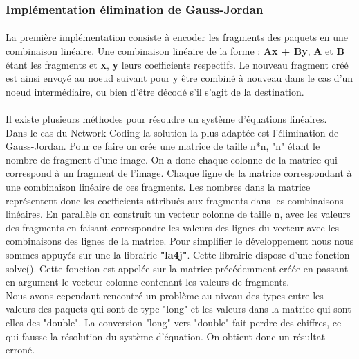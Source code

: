         
        \subsubsection{Implémentation élimination de Gauss-Jordan}
        
        \paragraph{}La première implémentation consiste à encoder les fragments des paquets en une combinaison linéaire.
        Une combinaison linéaire de la forme : \textbf{Ax + By}, \textbf{A} et \textbf{B} étant les fragments et \textbf{x}, \textbf{y} leurs coefficients respectifs.
        Le nouveau fragment créé est ainsi envoyé au noeud suivant pour y être combiné à nouveau dans le cas d'un noeud intermédiaire, ou bien d'être décodé s'il s'agit de la destination.
        
        \paragraph{}Il existe plusieurs méthodes pour résoudre un système d'équations linéaires.\\
        Dans le cas du Network Coding la solution la plus adaptée est l'élimination de Gauss-Jordan. 
        Pour ce faire on crée une matrice de taille n*n, "n" étant le nombre de fragment d'une image. 
        On a donc chaque colonne de la matrice qui correspond à un fragment de l'image.
        Chaque ligne de la matrice correspondant à une combinaison linéaire de ces fragments.
        Les nombres dans la matrice représentent donc les coefficients attribués aux fragments dans les combinaisons linéaires.
        En parallèle on construit un vecteur colonne de taille n, avec les valeurs des fragments en faisant correspondre les valeurs des lignes du vecteur avec les combinaisons des lignes de la matrice.
        Pour simplifier le développement nous nous sommes appuyés sur une la librairie \textbf{"la4j"}\cite{la4j}.
        Cette librairie dispose d'une fonction solve().
        Cette fonction est appelée sur la matrice précédemment créée en passant en argument le vecteur colonne contenant les valeurs de fragments.\\
        Nous avons cependant rencontré un problème au niveau des types entre les valeurs des paquets qui sont de type "long" et les valeurs dans la matrice qui sont elles des "double".
        La conversion "long" vers "double" fait perdre des chiffres, ce qui fausse la résolution du système d'équation. 
        On obtient donc un résultat erroné.\\
        
